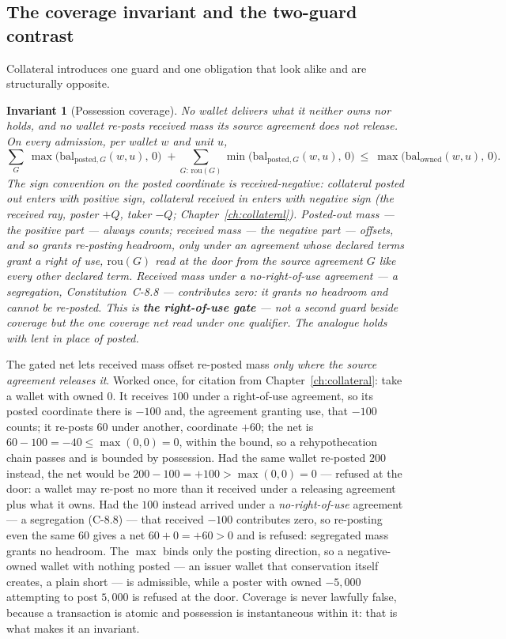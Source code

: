 \documentclass[11pt,a4paper]{article}
\newtheorem{invariant}[definition]{Invariant}
\begin{document}
\subsection{The coverage invariant and the two-guard contrast}

Collateral introduces one guard and one obligation that look alike and are
structurally opposite.

\begin{invariant}[Possession coverage]\label{inv:coverage}
No wallet delivers what it neither owns nor holds, and no wallet re-posts received
mass its source agreement does not release. On every admission, per wallet $w$ and
unit $u$,
\[
\sum_{G}\ \max\bigl(\mathrm{bal}_{\mathrm{posted},G}(w,u),\,0\bigr)
\;+\!\!\!\sum_{G:\,\mathrm{rou}(G)}\!\!\!\min\bigl(\mathrm{bal}_{\mathrm{posted},G}(w,u),\,0\bigr)
\ \le\ \max\bigl(\mathrm{bal}_{\mathrm{owned}}(w,u),\,0\bigr).
\]
The sign convention on the posted coordinate is \emph{received-negative}:
collateral posted \emph{out} enters with positive sign, collateral received
\emph{in} enters with negative sign (the received ray, poster $+Q$, taker $-Q$;
Chapter~\ref{ch:collateral}). Posted-out mass --- the positive part --- always
counts; received mass --- the negative part --- offsets, and so grants re-posting
headroom, only under an agreement whose declared terms grant a right of use,
$\mathrm{rou}(G)$ read at the door from the source agreement $G$ like every other
declared term. Received mass under a no-right-of-use agreement --- a segregation,
Constitution~C-8.8 --- contributes zero: it grants no headroom and cannot be
re-posted. This is \textbf{the right-of-use gate} --- not a second guard beside
coverage but the one coverage net read under one qualifier. The analogue holds
with lent in place of posted.
\end{invariant}

The gated net lets received mass offset re-posted mass \emph{only where the source
agreement releases it}. Worked once, for citation from
Chapter~\ref{ch:collateral}: take a wallet with owned $0$. It receives $100$ under a
right-of-use agreement, so its posted coordinate there is $-100$ and, the agreement
granting use, that $-100$ counts; it re-posts $60$ under another, coordinate $+60$;
the net is $60-100=-40\le\max(0,0)=0$, within the bound, so a rehypothecation chain
passes and is bounded by possession. Had the same wallet re-posted $200$ instead, the
net would be $200-100=+100>\max(0,0)=0$ --- refused at the door: a wallet may re-post
no more than it received under a releasing agreement plus what it owns. Had the $100$
instead arrived under a \emph{no-right-of-use} agreement --- a segregation (C-8.8) ---
that received $-100$ contributes zero, so re-posting even the same $60$ gives a net
$60+0=+60>0$ and is refused: segregated mass grants no headroom. The $\max$ binds
only the posting direction, so a negative-owned wallet with nothing posted --- an
issuer wallet that conservation itself creates, a plain short --- is admissible,
while a poster with owned $-5{,}000$ attempting to post $5{,}000$ is refused at the
door. Coverage is never lawfully false, because a transaction is atomic and
possession is instantaneous within it: that is what makes it an invariant.
\end{document}
